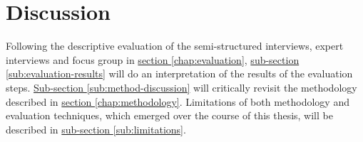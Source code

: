 \section{Discussion}
\label{chap:discussion}
Following the descriptive evaluation of the semi-structured interviews, expert interviews and focus group in \hyperref[chap:evaluation]{section \ref{chap:evaluation}}, \hyperref[sub:evaluation-results]{sub-section \ref{sub:evaluation-results}} will do an interpretation of the results of the evaluation steps. \hyperref[sub:method-discussion]{Sub-section \ref{sub:method-discussion}} will critically revisit the methodology described in \hyperref[chap:methodology]{section \ref{chap:methodology}}. Limitations of both methodology and evaluation techniques, which emerged over the course of this thesis, will be described in \hyperref[sub:limitations]{sub-section \ref{sub:limitations}}.


